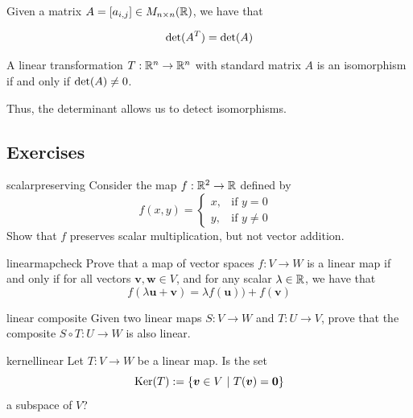 \begin{theorem}
Given a matrix $A = [a_{i,j}] \in M_{n\times n}(\mathbb{R})$, we have that 

$$\textnormal{det}(A^T) = \textnormal{det}(A)$$
\end{theorem}


\begin{theorem}
    A linear transformation $T: \mathbb{R}^n \to \mathbb{R}^n$ with standard matrix $A$ is an isomorphism if and only if $\textnormal{det}(A) \neq 0$.
    \end{theorem}

Thus, the determinant allows us to detect isomorphisms.  







\subsection{Exercises}



\begin{problem}{scalarpreserving}
Consider the map $f: \mathbb{R}^2 \to \mathbb{R}$ defined by $$f(x,y) =
\begin{cases}
x,  & \text{if $y=0$ } \\
y, & \text{if $y\neq 0$ }
\end{cases}$$
Show that $f$ preserves scalar multiplication, but not vector addition.
\end{problem}

\begin{problem}{linearmapcheck}
Prove that a map of vector spaces $f: V \to W$ is a linear map if and only if for all vectors $\bm{v}, \bm{w} \in V$, and for any scalar $\lambda \in \mathbb{R}$, we have that
$$f(\lambda \bm{u} + \bm{v}) = \lambda f(\bm{u}))+ f(\bm{v})$$

\end{problem}

\begin{problem}{linear composite}
Given two linear maps $S: V \to W$ and $T : U \to V$, prove that the composite $S \circ T : U \to W$ is also linear.
\end{problem}

\begin{problem}{kernellinear}
Let $T : V \to W$ be a linear map.  Is the set $$\textnormal{Ker}(T) := \{ \bm{v} \in V \ | \ T(\bm{v}) = \bm{0} \}$$ a subspace of $V$?
\end{problem}

